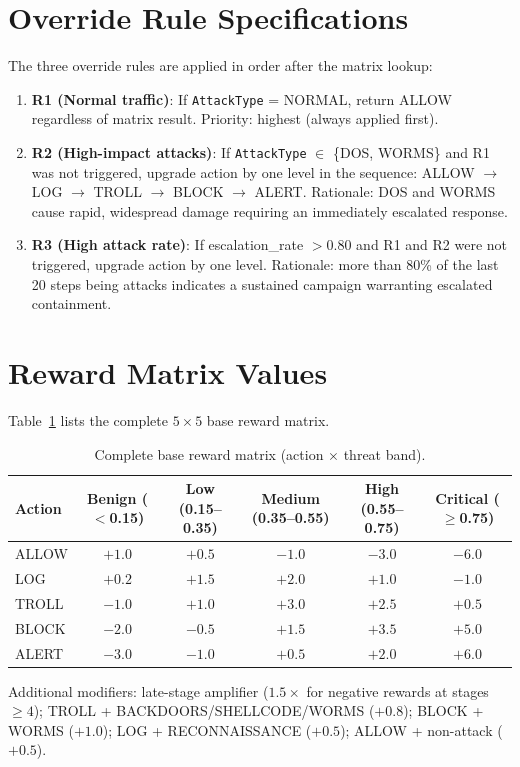 \section{Override Rule Specifications}

The three override rules are applied in order after the matrix lookup:

\begin{enumerate}
  \item \textbf{R1 (Normal traffic)}: If \texttt{AttackType} = NORMAL,
        return ALLOW regardless of matrix result.
        Priority: highest (always applied first).

  \item \textbf{R2 (High-impact attacks)}: If \texttt{AttackType} $\in$
        \{DOS, WORMS\} and R1 was not triggered, upgrade action by one
        level in the sequence:
        ALLOW $\to$ LOG $\to$ TROLL $\to$ BLOCK $\to$ ALERT.
        Rationale: DOS and WORMS cause rapid, widespread damage requiring
        an immediately escalated response.

  \item \textbf{R3 (High attack rate)}: If escalation\_rate $> 0.80$ and
        R1 and R2 were not triggered, upgrade action by one level.
        Rationale: more than 80\% of the last 20 steps being attacks
        indicates a sustained campaign warranting escalated containment.
\end{enumerate}

\section{Reward Matrix Values}

Table~\ref{tab:reward_full} lists the complete $5 \times 5$ base reward matrix.

\begin{table}[ht]
  \centering
  \caption{Complete base reward matrix (action $\times$ threat band).}
  \label{tab:reward_full}
  \begin{tabular}{lccccc}
    \toprule
    Action & Benign ($<$0.15) & Low (0.15--0.35) & Medium (0.35--0.55) & High (0.55--0.75) & Critical ($\geq$0.75) \\
    \midrule
    ALLOW & $+1.0$ & $+0.5$ & $-1.0$ & $-3.0$ & $-6.0$ \\
    LOG   & $+0.2$ & $+1.5$ & $+2.0$ & $+1.0$ & $-1.0$ \\
    TROLL & $-1.0$ & $+1.0$ & $+3.0$ & $+2.5$ & $+0.5$ \\
    BLOCK & $-2.0$ & $-0.5$ & $+1.5$ & $+3.5$ & $+5.0$ \\
    ALERT & $-3.0$ & $-1.0$ & $+0.5$ & $+2.0$ & $+6.0$ \\
    \bottomrule
  \end{tabular}
  \par\smallskip
  \footnotesize Additional modifiers: late-stage amplifier ($1.5\times$ for negative rewards at
  stages $\geq 4$); TROLL + BACKDOORS/SHELLCODE/WORMS ($+0.8$);
  BLOCK + WORMS ($+1.0$); LOG + RECONNAISSANCE ($+0.5$);
  ALLOW + non-attack ($+0.5$).
\end{table}
